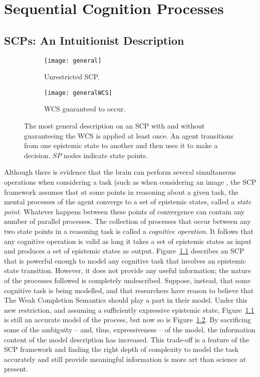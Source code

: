 \chapter{Sequential Cognition Processes} \label{chp:scp}
\section{SCPs: An Intuitionist Description} \label{ssec:intu}
\begin{figure*}
\begin{subfigure}{.35\textwidth}
  \centering
  \texttt{[image: general]}
  \caption{Unrestricted SCP.}
  \label{fig:scp_general}
\end{subfigure}%
\begin{subfigure}{.65\textwidth}
  \centering
  \texttt{[image: generalWCS]}
  \caption{WCS guaranteed to occur.}
  \label{fig:sfig2}
\end{subfigure}
\caption{The most general description on an SCP with and without guaranteeing the WCS is applied at least once. An agent transitions from one epistemic state to another and then uses it to make a decision. $SP$ nodes indicate state points.}
\label{fig:scp_generalWCS}
\end{figure*}

Although there is evidence that the brain can perform several simultaneous operations when considering a task (such as when considering an image \citep{sigman2008brain}, the SCP framework assumes that at some points in reasoning about a given task, the mental processes of the agent converge to a set of epistemic states, called a \textit{state point}. Whatever happens between these points of convergence can contain any number of parallel processes. The collection of processes that occur between any two state points in a reasoning task is called a \textit{cognitive operation}. It follows that any cognitive operation is valid as long it takes a set of epistemic states as input and produces a set of epistemic states as output. Figure~\ref{fig:scp_general} describes an SCP that is powerful enough to model any cognitive task that involves an epistemic state transition. However, it does not provide any useful information; the nature of the processes followed is completely undescribed. Suppose, instead, that some cognitive task is being modelled, and that researchers have reason to believe that The Weak Completion Semantics should play a part in their model. Under this new restriction, and assuming a sufficiently expressive epistemic state, Figure~\ref{fig:scp_general} is still an accurate model of the process, but now so is Figure~\ref{fig:sfig2}. By sacrificing some of the ambiguity -- and, thus, expressiveness -- of the model, the information content of the model description has increased. This trade-off is a feature of the SCP framework and finding the right depth of complexity to model the task accurately and still provide meaningful information is more art than science at present. 

